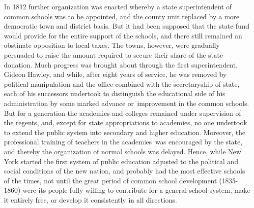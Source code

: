 \documentclass[]{book}
\begin{document}
In 1812 further organization was enacted whereby a state superintendent of common schools was to be appointed, and the county unit replaced by a more democratic town and district basis. But it had been supposed that the state fund would provide for the entire support of the schools, and there still remained an obstinate opposition to local taxes. The towns, however, were gradually persuaded to raise the amount required to secure their share of the state donation. Much progress was brought about through the first superintendent, Gideon Hawley, and while, after eight years of service, he was removed by political manipulation and the office combined with the secretaryship of state, each of his successors undertook to distinguish the educational side of his administration by some marked advance or~improvement in the common schools. But for a generation the academies and colleges remained under supervision of the regents, and, except for state appropriations to academies, no one undertook to extend the public system into secondary and higher education. Moreover, the professional training of teachers in the academies~was encouraged by the state, and thereby the organization of normal schools was delayed. Hence, while New York started the first system of public education adjusted to the political and social conditions of the new nation, and probably had the most effective schools of the times, not until the great period of common school development (1835-1860) were its people fully willing to contribute for a general school system, make it entirely free, or develop it consistently in all directions.
\end{document}
